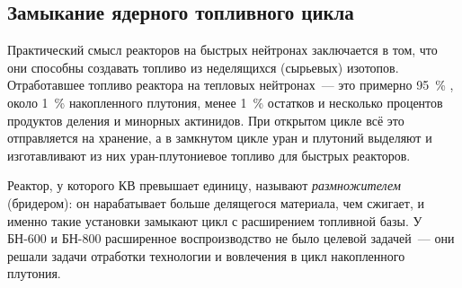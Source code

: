 \subsection*{Замыкание ядерного топливного цикла}

Практический смысл реакторов на быстрых нейтронах заключается в том, что они способны создавать топливо из неделящихся (сырьевых) изотопов. Отработавшее топливо реактора на тепловых нейтронах~--- это примерно \qty{95}{\percent} , около \qty{1}{\percent} накопленного плутония, менее \qty{1}{\percent} остатков  и несколько процентов продуктов деления и минорных актинидов. При открытом цикле всё это отправляется на хранение, а в замкнутом цикле уран и плутоний выделяют и изготавливают из них уран-плутониевое топливо для быстрых реакторов.

Реактор, у которого КВ превышает единицу, называют \emph{размножителем} (бридером): он нарабатывает больше делящегося материала, чем сжигает, и именно такие установки замыкают цикл с расширением топливной базы. У БН-600 и БН-800 расширенное воспроизводство не было целевой задачей~--- они решали задачи отработки технологии и вовлечения в цикл накопленного плутония.

\clearpage
